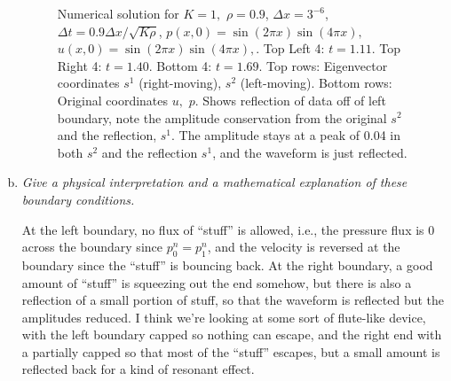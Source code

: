 \documentclass[12pt]{article}
\begin{document}
\begin{enumerate}[(a)]
\begin{figure}[H]
\caption{Numerical solution for $K=1,$ $\rho=0.9$, $\Delta x = 3^{-6}$, $\Delta t = 0.9 \Delta x / \sqrt{K \rho}$, $p(x,0) = \sin(2\pi x)\sin(4 \pi x),$
$u(x,0) = \sin(2\pi x)\sin(4 \pi x),$.  Top Left 4: $t=1.11$. Top Right 4: $t=1.40$. Bottom 4: $t=1.69$.  Top rows: Eigenvector coordinates $s^1$ (right-moving), $s^2$ (left-moving).  Bottom rows: Original coordinates $u,$ $p$.  Shows reflection of data off of left boundary, note the amplitude conservation from the original $s^2$ and the reflection, $s^1$. The amplitude stays at a peak of 0.04 in both $s^2$ and the reflection $s^1$, and the waveform is just reflected.}
\end{figure}


\item \emph{Give a physical interpretation and a mathematical explanation of these boundary conditions.}


At the left boundary, no flux of ``stuff'' is allowed, i.e., the pressure flux is 0 across the boundary since $p_0^n = p_1^n$, and the velocity is reversed at the boundary since the ``stuff'' is bouncing back.  At the right boundary, a good amount of ``stuff'' is squeezing out the end somehow, but there is also a reflection of a small portion of stuff, so that the waveform is reflected but the amplitudes reduced.   I think we're looking at some sort of flute-like device, with the left boundary capped so nothing can escape, and the right end with a partially capped so that most of the ``stuff'' escapes, but a small amount is reflected back for a kind of resonant effect.
\end{enumerate}
\newpage
\end{document}
